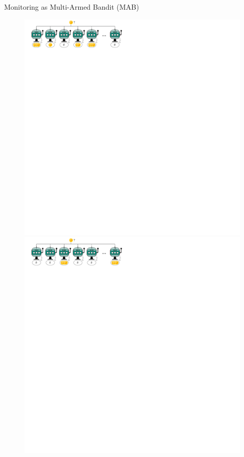 \documentclass[16pt,usenames,dvipsnames, notheorems]{beamer}
\theoremstyle{definition}
\theoremstyle{example}
\theoremstyle{plain}
\begin{document}
\begin{frame}{Monitoring as Multi-Armed Bandit (MAB)}
\begin{figure}
\begin{overprint}
	\includegraphics[width=1\linewidth]{figures/bandit_1tok_big_alice_1-compressed.pdf}
		\onslide<4->
	\includegraphics[width=1\linewidth]{figures/bandit_1tok_big_alice_0-compressed.pdf}
	\end{overprint}
\end{figure}


\end{frame}
\end{document}
